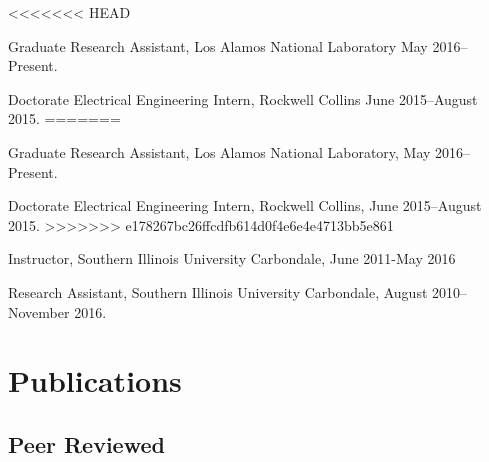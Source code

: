 \documentclass[letterpaper]{article}
\renewenvironment{itemize}{
  \begin{list}{}{
    \setlength{\leftmargin}{1.5em}
  }
}{
  \end{list}
}
\begin{document}
\begin{itemize}
<<<<<<< HEAD
\item Graduate Research Assistant, Los Alamos National Laboratory May 2016--Present.
\item Doctorate Electrical Engineering Intern, Rockwell Collins June 2015--August 2015.
=======
\item Graduate Research Assistant, Los Alamos National Laboratory, May 2016--Present.
\item Doctorate Electrical Engineering Intern, Rockwell Collins, June 2015--August 2015.
>>>>>>> e178267bc26ffcdfb614d0f4e6e4e4713bb5e861
\item Instructor, Southern Illinois University Carbondale, June 2011-May 2016
\item Research Assistant, Southern Illinois University Carbondale, August 2010--November 2016.
\end{itemize}


\section*{Publications}

\subsection*{Peer Reviewed}
\end{document}
